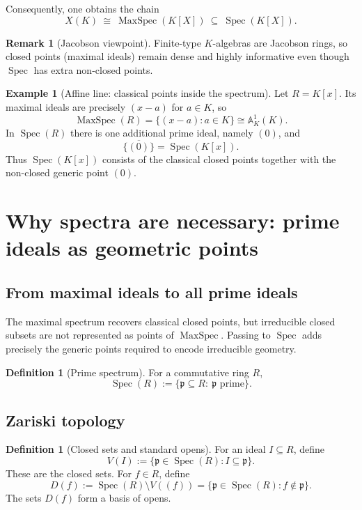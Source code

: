\documentclass[12pt, a4paper]{article}
\theoremstyle{definition}
\newtheorem{definition}[theorem]{Definition}
\newtheorem{example}[theorem]{Example}
\newtheorem{remark}[theorem]{Remark}
\DeclareMathOperator{\Spec}{Spec}
\DeclareMathOperator{\MaxSpec}{MaxSpec}
\newcommand{\A}{\mathbb{A}}
\begin{document}
Consequently, one obtains the chain
\[
\boxed{X(K)\ \cong\ \MaxSpec(K[X])\ \subseteq\ \Spec(K[X]).}
\]

\begin{remark}[Jacobson viewpoint]
Finite-type $K$-algebras are Jacobson rings, so closed points (maximal ideals) remain dense and highly informative even though $\Spec$ has extra non-closed points.
\end{remark}

\begin{example}[Affine line: classical points inside the spectrum]
Let $R=K[x]$. Its maximal ideals are precisely $(x-a)$ for $a\in K$, so
\[
\MaxSpec(R)=\{(x-a):a\in K\}\cong \A^1_K(K).
\]
In $\Spec(R)$ there is one additional prime ideal, namely $(0)$, and
\[
\overline{\{(0)\}}=\Spec(K[x]).
\]
Thus $\Spec(K[x])$ consists of the classical closed points together with the non-closed generic point $(0)$.
\end{example}

\section{Why spectra are necessary: prime ideals as geometric points}

\subsection{From maximal ideals to all prime ideals}

The maximal spectrum recovers classical closed points, but irreducible closed subsets are not represented as points of $\MaxSpec$. Passing to $\Spec$ adds precisely the generic points required to encode irreducible geometry.

\begin{definition}[Prime spectrum]
For a commutative ring $R$,
\[
\Spec(R):=\{\mathfrak p\subseteq R:\ \mathfrak p\text{ prime}\}.
\]
\end{definition}

\subsection{Zariski topology}

\begin{definition}[Closed sets and standard opens]
For an ideal $I\subseteq R$, define
\[
V(I):=\{\mathfrak p\in \Spec(R): I\subseteq \mathfrak p\}.
\]
These are the closed sets. For $f\in R$, define
\[
D(f):=\Spec(R)\setminus V((f))=\{\mathfrak p\in\Spec(R):f\notin \mathfrak p\}.
\]
The sets $D(f)$ form a basis of opens.
\end{definition}
\end{document}
